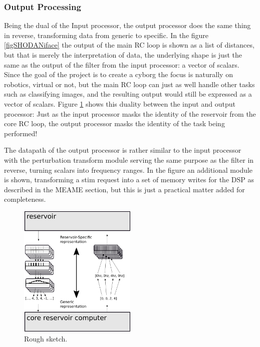 \subsubsection{Output Processing}
Being the dual of the Input processor, the output processor does the same thing
in reverse, transforming data from generic to specific.
In the figure \ref{figSHODANiface} the output of the main RC loop is shown as a
list of distances, but that is merely the interpretation of data, the underlying
shape is just the same as the output of the filter from the input processor: a
vector of scalars.
Since the goal of the project is to create a cyborg the focus is naturally on
robotics, virtual or not, but the main RC loop can just as well handle other
tasks such as classifying images, and the resulting output would still be
expressed as a vector of scalars.
Figure \ref{figGenericSpecific} shows this duality between the input and output
processor: Just as the input processor masks the identity of the reservoir from
the core RC loop, the output processor masks the identity of the task being
performed!\par
The datapath of the output processor is rather similar to the input processor
with the perturbation transform module serving the same purpose as the filter in
reverse, turning scalars into frequency ranges.
In the figure an additional module is shown, transforming a stim request into a
set of memory writes for the DSP as described in the MEAME section, but this is
just a practical matter added for completeness.
\begin{figure}[h!]
  \centering
  \includegraphics[width=0.5\textwidth]{fig/genericSpecific.png}
  \caption{Rough sketch.
  }
  \label{figGenericSpecific}
\end{figure}
